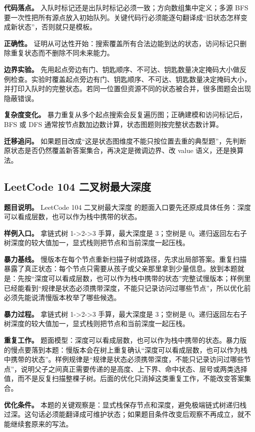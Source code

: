 \textbf{代码落点。} 入队时标记还是出队时标记必须一致；方向数组集中定义；多源 BFS 要一次性把所有源点放入初始队列。关键代码行必须能逐句翻译成“旧状态怎样变成新状态”，否则就只是模板。

\textbf{正确性。} 证明从可达性开始：搜索覆盖所有合法边能到达的状态，访问标记只删除重复状态而不删除不同未来能力。

\textbf{边界实验。} 先用起点旁边有门、钥匙顺序、不可达、钥匙数量决定掩码大小做反例检查。实验时覆盖起点旁边有门、钥匙顺序、不可达、钥匙数量决定掩码大小，并打印入队时的完整状态。若同一位置但资源不同的状态被合并，很多图题会出现隐蔽错误。

\textbf{复杂度变化。} 暴力重复从多个起点搜索会反复遍历图；正确建模和访问标记后，BFS 或 DFS 通常按节点数加边数计算，状态图题则按完整状态数计算。

\textbf{迁移追问。} 如果题目改成“这是状态图维度不能只按位置去重的典型题”，先判断原状态是否仍然覆盖新答案集合，再决定是微调边界、改 value 语义，还是换算法。

\subsection{LeetCode 104 二叉树最大深度}

\textbf{题目说明。} LeetCode 104 二叉树最大深度 的题面入口要先还原成具体任务：深度可以看成层数，也可以作为栈中携带的状态。

\textbf{样例入口。} 拿链式树 1->2->3 手算，最大深度是 3；空树是 0。递归返回左右子树深度的较大值加一，显式栈则把节点和当前深度一起压栈。

\textbf{暴力基线。} 慢版本在每个节点重新扫描子树或路径，先求出局部答案。重复扫描暴露了真正状态：每个节点只需要从孩子或父亲那里拿到少量信息。放到本题就是：先按“深度可以看成层数，也可以作为栈中携带的状态”完整试慢版本；样例里已经能看到“规律是状态必须携带深度，不能只记录访问过哪些节点”，所以优化前必须先能说清慢版本枚举了哪些候选。

\textbf{暴力过程。} 拿链式树 1->2->3 手算，最大深度是 3；空树是 0。递归返回左右子树深度的较大值加一，显式栈则把节点和当前深度一起压栈。

\textbf{重复工作。} 题面模型：深度可以看成层数，也可以作为栈中携带的状态。暴力版的慢点要落到本题：慢版本会在树上重复确认“深度可以看成层数，也可以作为栈中携带的状态”。样例规律是“规律是状态必须携带深度，不能只记录访问过哪些节点”，说明父子之间真正需要传递的是高度、上下界、命中状态、层号或两类选择值，而不是反复扫描整棵子树。后面的优化只消掉这类重复工作，不能改变答案集合。

\textbf{优化条件。} 本题的关键观察是：显式栈保存节点和深度，避免极端链式树递归栈过深。这句话必须能翻译成可维护状态；如果题目条件改变后观察不再成立，就不能继续套原来的写法。

